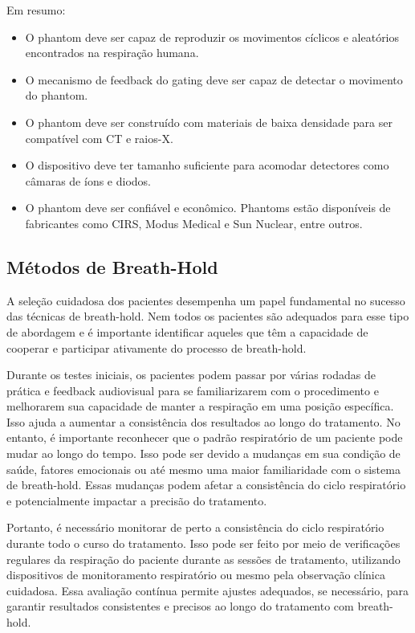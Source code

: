 \documentclass[11pt,a4paper]{article}
\begin{document}
	Em resumo:

	\begin{itemize}
		\item O phantom deve ser capaz de reproduzir os movimentos cíclicos e aleatórios encontrados na respiração humana.
		\item O mecanismo de feedback do gating deve ser capaz de detectar o movimento do phantom.
		\item O phantom deve ser construído com materiais de baixa densidade para ser compatível com CT e raios-X.
		\item O dispositivo deve ter tamanho suficiente para acomodar detectores como câmaras de íons e diodos.
		\item O phantom deve ser confiável e econômico. Phantoms estão disponíveis de fabricantes como CIRS, Modus Medical e Sun Nuclear, entre outros.
	\end{itemize}

\subsection*{Métodos de Breath-Hold}

	A seleção cuidadosa dos pacientes desempenha um papel fundamental no sucesso das técnicas de breath-hold. Nem todos os pacientes são adequados para esse tipo de abordagem e é importante identificar aqueles que têm a capacidade de cooperar e participar ativamente do processo de breath-hold. 

	Durante os testes iniciais, os pacientes podem passar por várias rodadas de prática e feedback audiovisual para se familiarizarem com o procedimento e melhorarem sua capacidade de manter a respiração em uma posição específica. Isso ajuda a aumentar a consistência dos resultados ao longo do tratamento. No entanto, é importante reconhecer que o padrão respiratório de um paciente pode mudar ao longo do tempo. Isso pode ser devido a mudanças em sua condição de saúde, fatores emocionais ou até mesmo uma maior familiaridade com o sistema de breath-hold. Essas mudanças podem afetar a consistência do ciclo respiratório e potencialmente impactar a precisão do tratamento.

	Portanto, é necessário monitorar de perto a consistência do ciclo respiratório durante todo o curso do tratamento. Isso pode ser feito por meio de verificações regulares da respiração do paciente durante as sessões de tratamento, utilizando dispositivos de monitoramento respiratório ou mesmo pela observação clínica cuidadosa. Essa avaliação contínua permite ajustes adequados, se necessário, para garantir resultados consistentes e precisos ao longo do tratamento com breath-hold.
\end{document}
